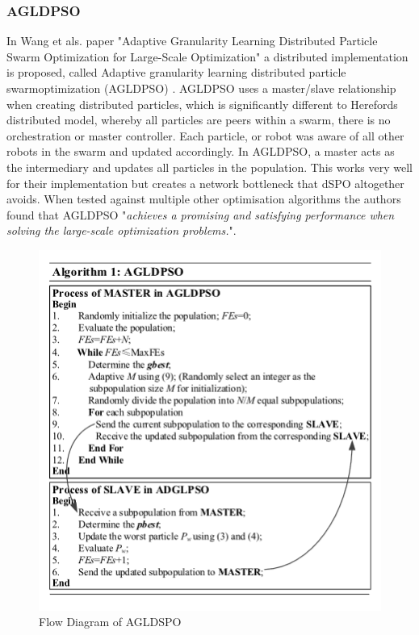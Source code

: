 \documentclass[oneside,12pt]{book}
\begin{document}
\subsubsection{AGLDPSO}
In Wang et als. paper "Adaptive Granularity Learning Distributed Particle Swarm Optimization for Large-Scale Optimization" a distributed implementation is proposed, called Adaptive granularity learning distributed particle swarmoptimization (AGLDPSO) \cite{wang2020adaptive}. AGLDPSO uses a master/slave relationship when creating distributed particles, which is significantly different to Herefords distributed model, whereby all particles are peers within a swarm, there is no orchestration or master controller. Each particle, or robot was aware of all other robots in the swarm and updated accordingly. In AGLDPSO, a master acts as the intermediary and updates all particles in the population. This works very well for their implementation but creates a network bottleneck that dSPO altogether avoids. When tested against multiple other optimisation algorithms the authors found that AGLDPSO "\textit{achieves a promising and satisfying performance when solving the large-scale optimization problems.}". 
\begin{figure}[H]
    \centering
    \includegraphics[scale=0.8]{Images/AGLDPSO.png}
    \caption{Flow Diagram of AGLDSPO \protect\cite{wang2020adaptive} }
    \label{fig:Flow Diagram of AGLDSPO}
\end{figure}
\end{document}
